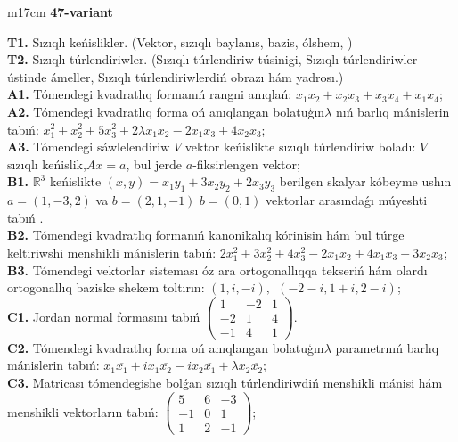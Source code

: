 \documentclass{article}
\begin{document}
\vspace{1cm}


\begin{tabular}{m{17cm}}
\textbf{47-variant}
\newline

\textbf{T1.} Sızıqlı keńislikler.   (Vektor,  sızıqlı baylanıs, bazis, ólshem, )  \\
\textbf{T2.} Sızıqlı túrlendiriwler.  (Sızıqlı túrlendiriw túsinigi, Sızıqlı túrlendiriwler ústinde ámeller, Sızıqlı túrlendiriwlerdiń obrazı hám yadrosı.) \\
\textbf{A1.} Tómendegi kvadratlıq formanıń rangni anıqlań: \(x_{1}x_{2} + x_{2}x_{3} + x_{3}x_{4} + x_{1}x_{4}\); \\
\textbf{A2.} Tómendegi kvadratlıq forma oń anıqlangan bolatuģın\(\lambda\) nıń barlıq mánislerin tabıń: \(x_{1}^{2} + x_{2}^{2} + 5x_{3}^{2} + 2\lambda x_{1}x_{2} - 2x_{1}x_{3} + 4x_{2}x_{3}\); \\
\textbf{A3.} Tómendegi sáwlelendiriw \(V\) vektor keńislikte sızıqlı túrlendiriw boladı: \(V\) sızıqlı keńislik,\(Ax = a\), bul jerde \(a\)-fiksirlengen vektor; \\
\textbf{B1.} \(\mathbb{R}^{3}\) keńislikte \((x,y) = x_{1}y_{1} + 3x_{2}y_{2} + 2x_{3}y_{3}\) berilgen skalyar kóbeyme ushın \(a = (1, - 3,2)\) va \(b = (2,1, - 1)\) \(b = (0,1)\) vektorlar arasındaǵı múyeshti tabıń . \\
\textbf{B2.} Tómendegi kvadratlıq formanıń kanonikalıq kórinisin hám bul túrge keltiriwshi menshikli mánislerin tabıń: \(2x_{1}^{2} + 3x_{2}^{2} + 4x_{3}^{2} - 2x_{1}x_{2} + 4x_{1}x_{3} - 3x_{2}x_{3}\); \\
\textbf{B3.} Tómendegi vektorlar sisteması óz ara ortogonallıqqa tekseriń hám olardı ortogonallıq baziske shekem toltırın: \((1,i, - i),\ \ ( - 2 - i,1 + i,2 - i)\); \\
\textbf{C1.} Jordan normal formasını tabıń \(\begin{pmatrix} 1 & - 2 & 1 \\  - 2 & 1 & 4 \\  - 1 & 4 & 1 \end{pmatrix}\). \\
\textbf{C2.} Tómendegi kvadratlıq forma oń anıqlangan bolatuģın\(\lambda\) parametrnıń barlıq mánislerin tabıń: \(x_{1}\overline{x_{1}} + ix_{1}\overline{x_{2}} - ix_{2}\overline{x_{1}} + \lambda x_{2}\overline{x_{2}}\); \\
\textbf{C3.} Matricası tómendegishe bolǵan sızıqlı túrlendiriwdiń menshikli mánisi hám menshikli vektorların tabıń: \(\begin{pmatrix} 5 & 6 & - 3 \\  - 1 & 0 & 1 \\ 1 & 2 & - 1 \end{pmatrix}\); \\

\end{tabular}
\vspace{1cm}
\end{document}
